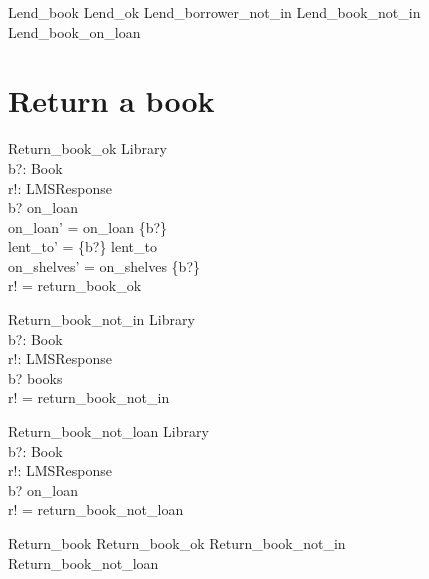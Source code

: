 \documentclass[11pt, fuzz]{article}
\begin{document}
\begin{zed}
    Lend\_book  Lend\_ok \lor Lend\_borrower\_not\_in \lor Lend\_book\_not\_in \lor \\ Lend\_book\_on\_loan
\end{zed}

\section{Return a book}


\begin{schema}{Return\_book\_ok}
    \Delta Library  \\
    b?: Book        \\
    r!: LMSResponse \\
\where
    b? \in on\_loan                        \\
    on\_loan' = on\_loan \setminus \{b?\}  \\
    lent\_to' = \{b?\} \ndres lent\_to     \\
    on\_shelves' = on\_shelves \cup \{b?\} \\
    r! = return\_book\_ok                   \\
\end{schema}

\begin{schema}{Return\_book\_not\_in}
    \Xi Library     \\
    b?: Book        \\
    r!: LMSResponse \\
\where
    b? \notin books                        \\
    r! = return\_book\_not\_in              \\
\end{schema}

\begin{schema}{Return\_book\_not\_loan}
    \Xi Library     \\
    b?: Book        \\
    r!: LMSResponse \\
\where
    b? \notin on\_loan          \\
    r! = return\_book\_not\_loan \\
\end{schema}

\begin{zed}
    Return\_book  Return\_book\_ok \lor Return\_book\_not\_in \lor \\ Return\_book\_not\_loan
\end{zed}
\end{document}
